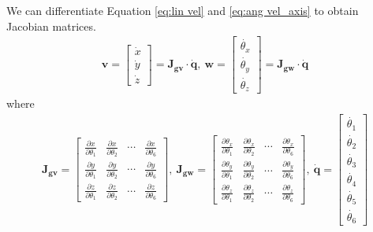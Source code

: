 We can differentiate Equation \ref{eq:lin vel} and \ref{eq:ang vel_axis} to obtain Jacobian matrices.
\begin{equation}
\begin{split}
\boldsymbol{v} 
= 
\begin{bmatrix}
\dot{x}\\
\dot{y}\\
\dot{z}
\end{bmatrix}
=
\mathbf{J_{gv}} \cdot \boldsymbol{\dot{q}}
,\ 
\boldsymbol{w} 
= 
\begin{bmatrix}
\dot{\theta _x}\\
\dot{\theta _y}\\
\dot{\theta _z}
\end{bmatrix}
=
\mathbf{J_{gw}} \cdot \boldsymbol{\dot{q}}
\end{split}
\end{equation}
where
\begin{equation*}
\begin{split}
\mathbf{J_{gv}} =
\begin{bmatrix}
\frac{\partial x}{\partial \theta _1}	&\frac{\partial x}{\partial \theta _2}	&\cdots		&\frac{\partial x}{\partial \theta _6}\\
\frac{\partial y}{\partial \theta _1}	&\frac{\partial y}{\partial \theta _2}	&\cdots		&\frac{\partial y}{\partial \theta _6}\\
\frac{\partial z}{\partial \theta _1}	&\frac{\partial z}{\partial \theta _2}	&\cdots		&\frac{\partial z}{\partial \theta _6}
\end{bmatrix}
,\ \mathbf{J_{gw}} = 
\begin{bmatrix}
\frac{\partial \theta _x}{\partial \theta _1}	&\frac{\partial \theta _x}{\partial \theta _2}	&\cdots		&\frac{\partial \theta _x}{\partial \theta _6}\\
\frac{\partial \theta _y}{\partial \theta _1}	&\frac{\partial \theta _y}{\partial \theta _2}	&\cdots		&\frac{\partial \theta _y}{\partial \theta _6}\\
\frac{\partial \theta _z}{\partial \theta _1}	&\frac{\partial \theta _z}{\partial \theta _2}	&\cdots		&\frac{\partial \theta _z}{\partial \theta _6}
\end{bmatrix} 
,\ \boldsymbol{\dot{q}}
=
\begin{bmatrix}
\dot{\theta _1} \\ 
\dot{\theta _2} \\ 
\dot{\theta _3} \\ 
\dot{\theta _4} \\ 
\dot{\theta _5} \\ 
\dot{\theta _6} 
\end{bmatrix}\\
\end{split}
\end{equation*}
